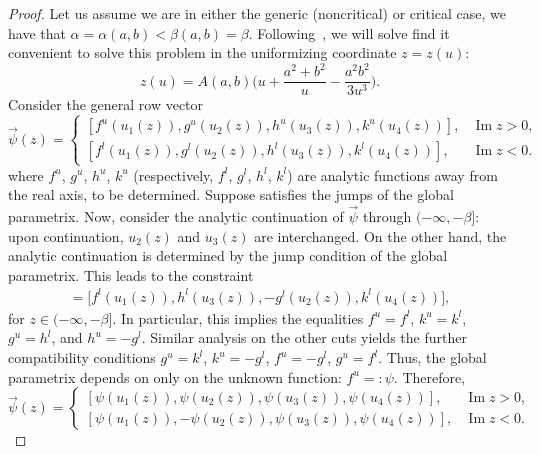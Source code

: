 \documentclass[pdftex]{sigma}
\numberwithin{equation}{section}
\begin{document}
\begin{proof}
Let us assume we are in either the generic (noncritical) or critical case, we have that $\alpha = \alpha(a,b) < \beta(a,b) = \beta$.
Following~\cite{DK1}, we will solve find it convenient to solve this problem in the uniformizing coordinate $z = z(u)$:
 \begin{equation*}
 z(u) = A(a,b)\biggl(u + \frac{a^2+b^2}{u} - \frac{a^2b^2}{3u^3}\biggr).
 \end{equation*}
Consider the general row vector
 \begin{equation*}
 \vec{\psi}(z) =
 \begin{cases}
 [f^u(u_1(z)), g^u(u_2(z)), h^u(u_3(z)), k^u(u_4(z)) ], & \operatorname{Im} z>0,\\
 [f^l(u_1(z)), g^l(u_2(z)), h^l(u_3(z)), k^l(u_4(z)) ], & \operatorname{Im} z<0.
 \end{cases}
 \end{equation*}
where $f^u$, $g^u$, $h^u$, $k^u$ \big(respectively, $f^l$, $g^l$, $h^l$, $k^l$\big) are analytic functions away from the real axis, to be determined. Suppose  satisfies the jumps of the
global parametrix. Now, consider the analytic continuation of $\vec{\psi}$
through $(-\infty,-\beta]$: upon continuation, $u_2(z)$ and $u_3(z)$ are interchanged. On the other hand, the analytic continuation is determined by the
jump condition of the global parametrix. This leads to the constraint
 \begin{gather*}
 [f^u(u_1(z)), g^u(u_3(z)),h^u(u_2(z)),k^u(u_4(z))]
 = \bigl[f^l(u_1(z)), h^l(u_3(z)),-g^l(u_2(z)),k^l(u_4(z))\bigr],
 \end{gather*}
for $z\in (-\infty,-\beta]$. In particular, this implies the equalities $f^u = f^l$, $k^u=k^l$, $g^u = h^l$, and $h^u = -g^l$. Similar analysis on the other cuts yields the further compatibility conditions
 $g^u = k^l$, $k^u = -g^l$, $f^u = -g^l$, $g^u = f^l$.
Thus, the global parametrix depends on only on the unknown function: $f^u =: \psi$. Therefore,
 \begin{equation*}
 \vec{\psi}(z) =
 \begin{cases}
 [\psi(u_1(z)), \psi(u_2(z)), \psi(u_3(z)), \psi(u_4(z)) ], & \operatorname{Im} z>0,\\
 [\psi(u_1(z)), -\psi(u_2(z)), \psi(u_3(z)), \psi(u_4(z)) ], & \operatorname{Im} z<0.
 \end{cases}
 \end{equation*}


\end{proof}
\end{document}
